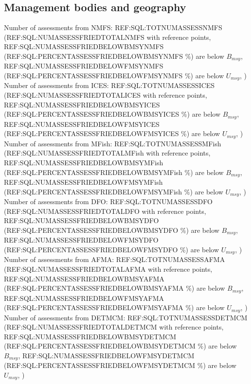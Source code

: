 \subsection*{Management bodies and geography}
\noindent
Number of assessments from NMFS: REF:SQL:TOTNUMASSESSNMFS (REF:SQL:NUMASSESSFRIEDTOTALNMFS with reference points, REF:SQL:NUMASSESSFRIEDBELOWBMSYNMFS (REF:SQL:PERCENTASSESSFRIEDBELOWBMSYNMFS \%) are below $B_{msy}$, REF:SQL:NUMASSESSFRIEDBELOWFMSYNMFS (REF:SQL:PERCENTASSESSFRIEDBELOWFMSYNMFS \%) are below $U_{msy}$, ) \\
Number of assessments from ICES: REF:SQL:TOTNUMASSESSICES (REF:SQL:NUMASSESSFRIEDTOTALICES with reference points, REF:SQL:NUMASSESSFRIEDBELOWBMSYICES (REF:SQL:PERCENTASSESSFRIEDBELOWBMSYICES \%) are below $B_{msy}$, REF:SQL:NUMASSESSFRIEDBELOWFMSYICES (REF:SQL:PERCENTASSESSFRIEDBELOWFMSYICES \%) are below $U_{msy}$, ) \\
Number of assessments from MFish: REF:SQL:TOTNUMASSESSMFish (REF:SQL:NUMASSESSFRIEDTOTALMFish with reference points, REF:SQL:NUMASSESSFRIEDBELOWBMSYMFish (REF:SQL:PERCENTASSESSFRIEDBELOWBMSYMFish \%) are below $B_{msy}$, REF:SQL:NUMASSESSFRIEDBELOWFMSYMFish (REF:SQL:PERCENTASSESSFRIEDBELOWFMSYMFish \%) are below $U_{msy}$, ) \\
Number of assessments from DFO: REF:SQL:TOTNUMASSESSDFO (REF:SQL:NUMASSESSFRIEDTOTALDFO with reference points, REF:SQL:NUMASSESSFRIEDBELOWBMSYDFO (REF:SQL:PERCENTASSESSFRIEDBELOWBMSYDFO \%) are below $B_{msy}$, REF:SQL:NUMASSESSFRIEDBELOWFMSYDFO (REF:SQL:PERCENTASSESSFRIEDBELOWFMSYDFO \%) are below $U_{msy}$, ) \\
Number of assessments from AFMA: REF:SQL:TOTNUMASSESSAFMA (REF:SQL:NUMASSESSFRIEDTOTALAFMA with reference points, REF:SQL:NUMASSESSFRIEDBELOWBMSYAFMA (REF:SQL:PERCENTASSESSFRIEDBELOWBMSYAFMA \%) are below $B_{msy}$, REF:SQL:NUMASSESSFRIEDBELOWFMSYAFMA (REF:SQL:PERCENTASSESSFRIEDBELOWFMSYAFMA \%) are below $U_{msy}$, ) \\
Number of assessments from DETMCM: REF:SQL:TOTNUMASSESSDETMCM (REF:SQL:NUMASSESSFRIEDTOTALDETMCM with reference points, REF:SQL:NUMASSESSFRIEDBELOWBMSYDETMCM (REF:SQL:PERCENTASSESSFRIEDBELOWBMSYDETMCM \%) are below $B_{msy}$, REF:SQL:NUMASSESSFRIEDBELOWFMSYDETMCM (REF:SQL:PERCENTASSESSFRIEDBELOWFMSYDETMCM \%) are below $U_{msy}$, ) \\

